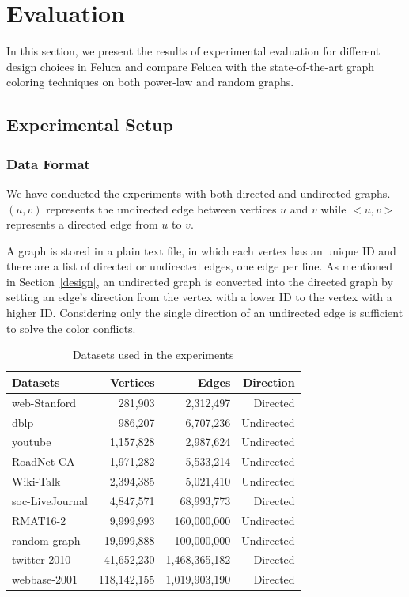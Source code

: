 \section{Evaluation}
\label{experiments}

In this section, we present the results of experimental evaluation for different design choices in Feluca and compare Feluca with the state-of-the-art graph coloring techniques on both power-law and random graphs.

\subsection{Experimental Setup}
\subsubsection{Data Format}
\label{subsec.format}
We have conducted the experiments with both directed and undirected graphs. $(u, v)$ represents the undirected edge between vertices $u$ and $v$ while $<u, v>$ represents a directed edge from $u$ to $v$.

A graph is stored in a plain text file, in which each vertex has an unique ID and there are a list of directed or undirected edges, one edge per line. As mentioned in Section~\ref{design}, an undirected graph is converted into the directed graph by setting an edge's direction from the vertex with a lower ID to the vertex with a higher ID. Considering only the single direction of an undirected edge is sufficient to solve the color conflicts.

\begin{table}[h]
\centering
\caption{Datasets used in the experiments}
\label{tab:datasets}
\begin{tabular}{|l|r|r|r|}
\hline
 Datasets					&Vertices						&Edges					&Direction\\\hline
 web-Stanford			&281,903						&2,312,497			&Directed \\
 dblp							&986,207						&6,707,236			&Undirected \\
 youtube					&1,157,828					&2,987,624			&Undirected \\
 RoadNet-CA				&1,971,282					&5,533,214			&Undirected \\
 Wiki-Talk				&2,394,385					&5,021,410			&Undirected \\
 soc-LiveJournal	&4,847,571					&68,993,773			&Directed \\
 RMAT16-2					&9,999,993					&160,000,000		&Undirected \\
 random-graph			&19,999,888					&100,000,000		&Undirected \\
 twitter-2010			&41,652,230					&1,468,365,182	&Directed \\
 webbase-2001			&118,142,155				&1,019,903,190	&Directed\\ \hline
\end{tabular}
\end{table}

